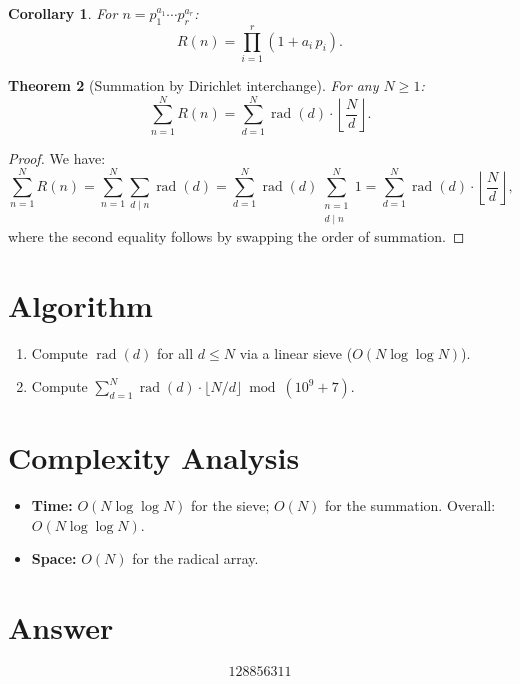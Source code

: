 \documentclass[11pt]{article}
\newtheorem{theorem}{Theorem}
\newtheorem{corollary}[theorem]{Corollary}
\theoremstyle{definition}
\begin{document}
\begin{corollary}
For $n = p_1^{a_1} \cdots p_r^{a_r}$:
\[
R(n) = \prod_{i=1}^{r} (1 + a_i \, p_i).
\]
\end{corollary}

\begin{theorem}[Summation by Dirichlet interchange]
For any $N \geq 1$:
\[
\sum_{n=1}^{N} R(n) = \sum_{d=1}^{N} \operatorname{rad}(d) \cdot \left\lfloor \frac{N}{d} \right\rfloor.
\]
\end{theorem}

\begin{proof}
We have:
\[
\sum_{n=1}^{N} R(n) = \sum_{n=1}^{N} \sum_{d \mid n} \operatorname{rad}(d) = \sum_{d=1}^{N} \operatorname{rad}(d) \sum_{\substack{n=1 \\ d \mid n}}^{N} 1 = \sum_{d=1}^{N} \operatorname{rad}(d) \cdot \left\lfloor \frac{N}{d} \right\rfloor,
\]
where the second equality follows by swapping the order of summation.
\end{proof}

\section{Algorithm}

\begin{enumerate}
\item Compute $\operatorname{rad}(d)$ for all $d \leq N$ via a linear sieve ($O(N \log \log N)$).
\item Compute $\sum_{d=1}^{N} \operatorname{rad}(d) \cdot \lfloor N/d \rfloor \bmod (10^9+7)$.
\end{enumerate}

\section{Complexity Analysis}

\begin{itemize}
\item \textbf{Time:} $O(N \log \log N)$ for the sieve; $O(N)$ for the summation. Overall: $O(N \log \log N)$.
\item \textbf{Space:} $O(N)$ for the radical array.
\end{itemize}

\section{Answer}

\[
\boxed{128856311}
\]
\end{document}
